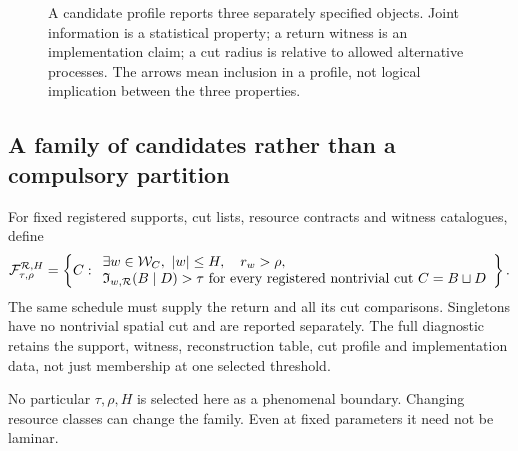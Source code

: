 \begin{figure}[tb]
\centering


\caption{A candidate profile reports three separately specified objects. Joint information is a statistical property; a return witness is an implementation claim; a cut radius is relative to allowed alternative processes. The arrows mean inclusion in a profile, not logical implication between the three properties.}\label{fig:three-layers}
\end{figure}

\subsection{A family of candidates rather than a compulsory partition}
\begin{definition}\label{p2-13}
For fixed registered supports, cut lists, resource contracts and witness catalogues, define
\begin{equation}\label{eq:candidate-family}
 \mathcal F_{\tau,\rho}^{\mathcal R,H}
 =\left\{C:\begin{array}{l}
 \exists w\in\mathcal W_C,\ |w|\le H,\quad r_w>\rho,\\
 \mathfrak I_{w,\mathcal R}(B\mid D)>\tau
 \text{ for every registered nontrivial cut }C=B\sqcup D
 \end{array}\right\}.
\end{equation}
The same schedule must supply the return and all its cut comparisons. Singletons have no nontrivial spatial cut and are reported separately. The full diagnostic retains the support, witness, reconstruction table, cut profile and implementation data, not just membership at one selected threshold.
\end{definition}
No particular \(\tau,\rho,H\) is selected here as a phenomenal boundary. Changing resource classes can change the family. Even at fixed parameters it need not be laminar.

